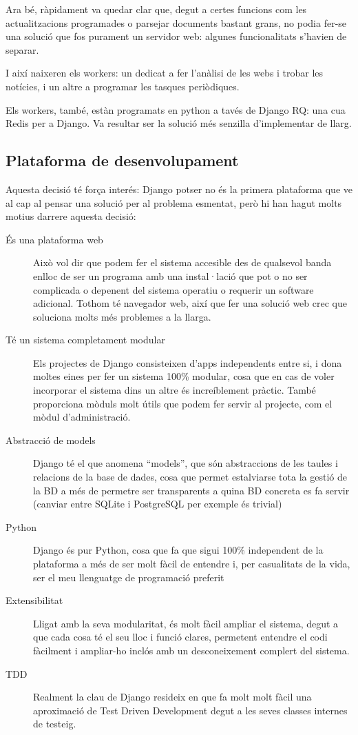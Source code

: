 \documentclass{article}
\begin{document}
Ara bé, ràpidament va quedar clar que, degut a certes funcions com les actualitzacions programades o parsejar documents bastant grans, no podia fer-se una solució que fos purament un servidor web: algunes funcionalitats s'havien de separar.

I així naixeren els workers: un dedicat a fer l'anàlisi de les webs i trobar les notícies, i un altre a programar les tasques periòdiques.

Els workers, també, estàn programats en python a tavés de Django RQ\@: una cua Redis per a Django. Va resultar ser la solució més senzilla d'implementar de llarg.

\newpage

\subsection{Plataforma de desenvolupament}

Aquesta decisió té força interés: Django potser no és la primera plataforma que ve al cap al pensar una solució per al problema esmentat, però hi han hagut molts motius darrere aquesta decisió:

\begin{description}
    \item[És una plataforma web] Això vol dir que podem fer el sistema accesible des de qualsevol banda enlloc de ser un programa amb una instal·lació que pot o no ser complicada o depenent del sistema operatiu o requerir un software adicional. Tothom té navegador web, així que fer una solució web crec que soluciona molts més problemes a la llarga.
    \item[Té un sistema completament modular] Els projectes de Django consisteixen d'apps independents entre si, i dona moltes eines per fer un sistema 100\% modular, cosa que en cas de voler incorporar el sistema dins un altre és increíblement pràctic. També proporciona mòduls molt útils que podem fer servir al projecte, com el mòdul d'administració.
    \item[Abstracció de models] Django té el que anomena ``models'', que són abstraccions de les taules i relacions de la base de dades, cosa que permet estalviarse tota la gestió de la BD a més de permetre ser transparents a quina BD concreta es fa servir (canviar entre SQLite i PostgreSQL per exemple és trivial)
    \item[Python] Django és pur Python, cosa que fa que sigui 100\% independent de la plataforma a més de ser molt fàcil de entendre i, per casualitats de la vida, ser el meu llenguatge de programació preferit
    \item[Extensibilitat] Lligat amb la seva modularitat, és molt fàcil ampliar el sistema, degut a que cada cosa té el seu lloc i funció clares, permetent entendre el codi fàcilment i ampliar-ho inclós amb un desconeixement complert del sistema.
    \item[TDD] Realment la clau de Django resideix en que fa molt molt fàcil una aproximació de Test Driven Development degut a les seves classes internes de testeig.
\end{description}
\end{document}
